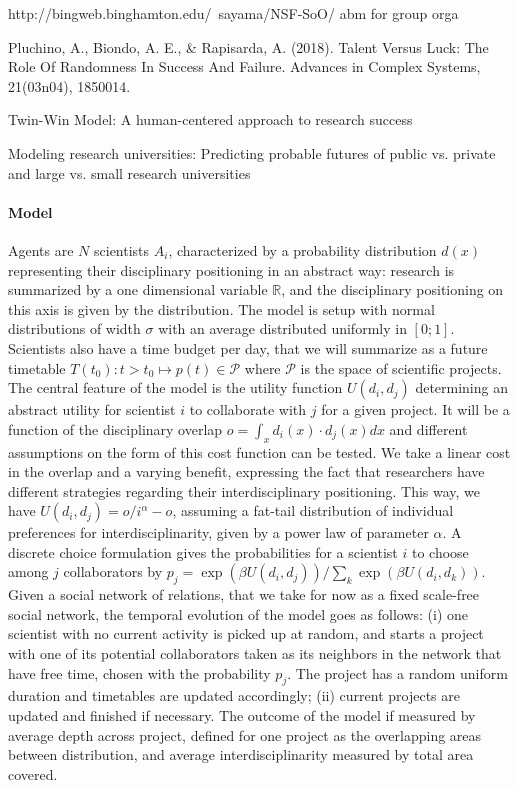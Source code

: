 http://bingweb.binghamton.edu/~sayama/NSF-SoO/ abm for group orga

Pluchino, A., Biondo, A. E., & Rapisarda, A. (2018). Talent Versus Luck: The Role Of Randomness In Success And Failure. Advances in Complex Systems, 21(03n04), 1850014.

Twin-Win Model: A human-centered approach to research success

Modeling research universities: Predicting probable futures of public vs. private and large vs. small research universities

\paragraph{Model}

Agents are $N$ scientists $A_i$, characterized by a probability distribution $d(x)$ representing their disciplinary positioning in an abstract way: research is summarized by a one dimensional variable $\mathbb{R}$, and the disciplinary positioning on this axis is given by the distribution. The model is setup with normal distributions of width $\sigma$ with an average distributed uniformly in $\left[0;1\right]$. Scientists also have a time budget per day, that we will summarize as a future timetable $T(t_0):t>t_0 \mapsto p(t) \in \mathcal{P}$ where $\mathcal{P}$ is the space of scientific projects. The central feature of the model is the utility function $U(d_i,d_j)$ determining an abstract utility for scientist $i$ to collaborate with $j$ for a given project. It will be a function of the disciplinary overlap $o = \int_x d_i(x)\cdot d_j(x) dx$ and different assumptions on the form of this cost function can be tested. We take a linear cost in the overlap and a varying benefit, expressing the fact that researchers have different strategies regarding their interdisciplinary positioning. This way, we have $U(d_i,d_j) = o / i^\alpha - o$, assuming a fat-tail distribution of individual preferences for interdisciplinarity, given by a power law of parameter $\alpha$. A discrete choice formulation gives the probabilities for a scientist $i$ to choose among $j$ collaborators by $p_j = \exp\left(\beta U(d_i,d_j) \right)/\sum_k \exp\left(\beta U(d_i,d_k) \right)$. Given a social network of relations, that we take for now as a fixed scale-free social network, the temporal evolution of the model goes as follows: (i) one scientist with no current activity is picked up at random, and starts a project with one of its potential collaborators taken as its neighbors in the network that have free time, chosen with the probability $p_j$. The project has a random uniform duration and timetables are updated accordingly; (ii) current projects are updated and finished if necessary. The outcome of the model if measured by average depth across project, defined for one project as the overlapping areas between distribution, and average interdisciplinarity measured by total area covered.


